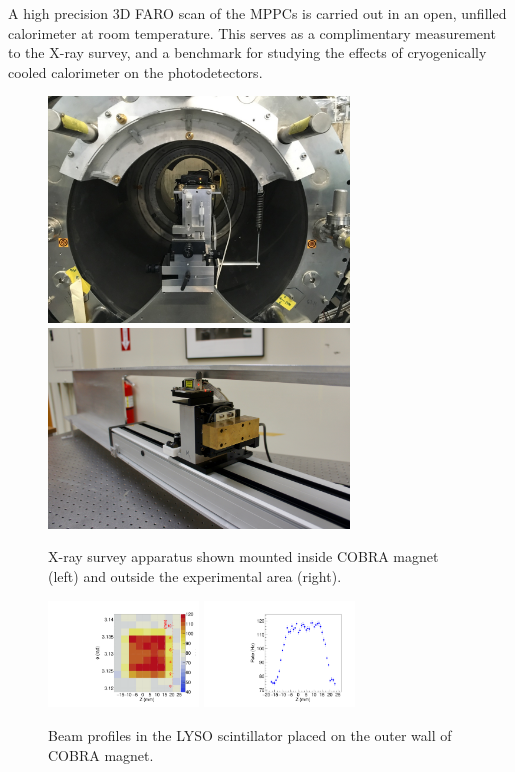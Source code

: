A high precision 3D FARO scan\cite{faro} of the MPPCs is carried out
in an open, unfilled calorimeter at room temperature.  This serves as
a complimentary measurement to the X-ray survey, and a benchmark for
studying the effects of cryogenically cooled calorimeter on the
photodetectors.

\begin{figure}[]
\includegraphics[width=8cm]{plots/photo4}
\includegraphics[width=8cm]{plots/photo3}
\caption{X-ray survey apparatus shown mounted inside COBRA magnet
  (left) and outside the experimental area (right).}
\label{fig:photo}
\end{figure}  

\begin{figure}[]
\includegraphics[width=4cm]{plots/xray_lyso.pdf}
\includegraphics[width=4cm]{plots/xray_lyso3_jun5.pdf}
\caption{Beam profiles in the LYSO scintillator placed on the outer
  wall of COBRA magnet.}
\label{fig:beamprofile}
\end{figure}  

